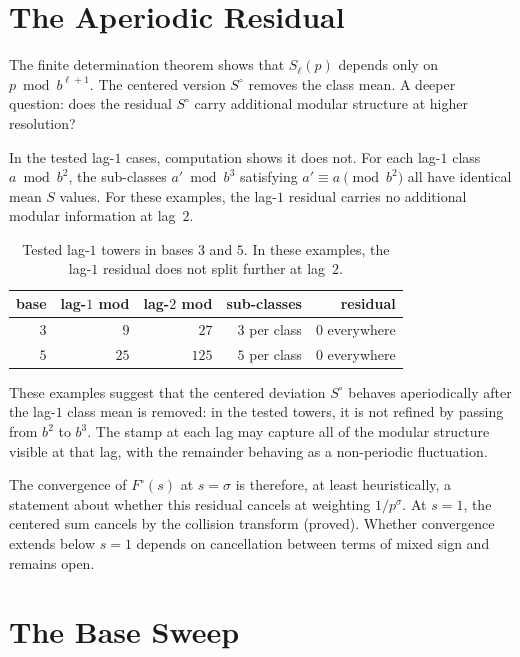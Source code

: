\documentclass[12pt]{amsart}
\theoremstyle{definition}
\theoremstyle{remark}
\begin{document}
\section{The Aperiodic Residual}

The finite determination theorem shows that
$S_{\ell}(p)$ depends only on $p \bmod b^{\ell+1}$. The
centered version $S^{\circ}$ removes the class mean. A
deeper question: does the residual $S^{\circ}$ carry
additional modular structure at higher resolution?

In the tested lag-$1$ cases, computation shows it does
not. For each lag-$1$ class
$a \bmod b^2$, the sub-classes $a' \bmod b^3$ satisfying
$a' \equiv a \pmod{b^2}$ all have identical mean $S$
values. For these examples, the lag-$1$ residual carries
no additional modular information at lag~$2$.

\begin{table}[h]
\centering
\begin{tabular}{rrrrr}
\toprule
base & lag-$1$ mod & lag-$2$ mod & sub-classes & residual \\
\midrule
$3$ & $9$ & $27$ & $3$ per class & $0$ everywhere \\
$5$ & $25$ & $125$ & $5$ per class & $0$ everywhere \\
\bottomrule
\end{tabular}
\caption{Tested lag-$1$ towers in bases $3$ and $5$.
In these examples, the lag-$1$ residual does not split
further at lag~$2$.}
\label{tab:tower}
\end{table}

These examples suggest that the centered deviation
$S^{\circ}$ behaves aperiodically after the lag-$1$ class
mean is removed: in the tested towers, it is not refined
by passing from $b^2$ to $b^3$. The stamp at each lag may
capture all of the modular structure visible at that lag,
with the remainder behaving as a non-periodic fluctuation.

The convergence of $F^{\circ}(s)$ at $s = \sigma$ is
therefore, at least heuristically, a statement about
whether this residual cancels at weighting $1/p^{\sigma}$.
At $s = 1$, the centered sum cancels by the collision
transform (proved). Whether convergence extends below
$s = 1$ depends on cancellation between terms of mixed
sign and remains open.

\section{The Base Sweep}
\end{document}
